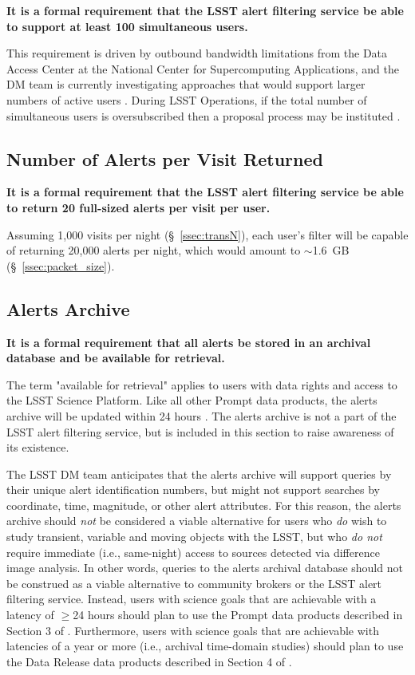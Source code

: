 \documentclass[DM,lsstdraft,authoryear,toc]{lsstdoc}
\begin{document}
{\bf It is a formal requirement that the LSST alert filtering service be able to support at least 100 simultaneous users.}

This requirement is driven by outbound bandwidth limitations from the Data Access Center at the National Center for Supercomputing Applications, and the DM team is currently investigating approaches that would support larger numbers of active users . During LSST Operations, if the total number of simultaneous users is oversubscribed then a proposal process may be instituted .


\subsection{Number of Alerts per Visit Returned}\label{ssec:LAFS_returns}

{\bf It is a formal requirement that the LSST alert filtering service be able to return 20 full-sized alerts per visit per user.}

Assuming 1,000 visits per night (\S~\ref{ssec:transN}), each user's filter will be capable of returning 20,000 alerts per night, which would amount to $\sim$1.6~GB (\S~\ref{ssec:packet_size}).


\subsection{Alerts Archive}\label{ssec:LAFS_adb}

{\bf It is a formal requirement that all alerts be stored in an archival database and be available for retrieval.}

The term "available for retrieval" applies to users with data rights and access to the LSST Science Platform. Like all other Prompt data products, the alerts archive will be updated within 24 hours . The alerts archive is not a part of the LSST alert filtering service, but is included in this section to raise awareness of its existence. 

The LSST DM team anticipates that the alerts archive will support queries by their unique alert identification numbers, but might not support searches by coordinate, time, magnitude, or other alert attributes. For this reason, the alerts archive should {\em not} be considered a viable alternative for users who {\em do} wish to study transient, variable and moving objects with the LSST, but who {\em do not} require immediate (i.e., same-night) access to sources detected via difference image analysis. In other words, queries to the alerts archival database should not be construed as a viable alternative to community brokers or the LSST alert filtering service. Instead, users with science goals that are achievable with a latency of $\geq$24 hours should plan to use the Prompt data products described in Section 3 of . Furthermore, users with science goals that are achievable with latencies of a year or more (i.e., archival time-domain studies) should plan to use the Data Release data products described in Section 4 of .



\end{document}
